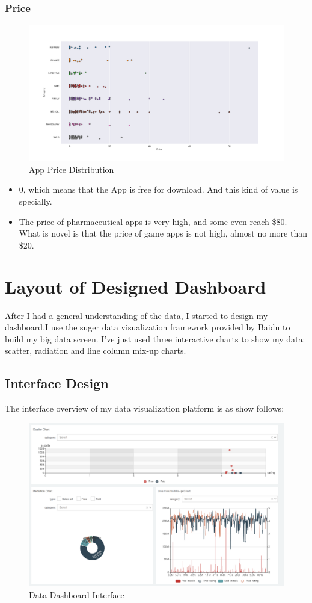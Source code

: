 \documentclass{hci}
\begin{document}
\subsubsection{Price}
\begin{figure}[htbp]
	\centering
	\includegraphics[width=0.7\linewidth]{figures/Price}
	\caption{App Price Distribution}
	\label{fig:Apppricedistribution}
\end{figure}


\begin{itemize}
	\item 0, which means that the App is free for download. And this kind of value is specially.
	\item The price of pharmaceutical apps is very high, and some even reach \$80. What is novel is that the price of game apps is not high, almost no more than \$20.
	
\end{itemize}

\section{Layout of Designed Dashboard}
After I had a general understanding of the data, I started to design my dashboard.I use the suger data visualization framework provided by Baidu to build my big data screen. I've just used three interactive charts to show my data:
scatter, radiation and line column mix-up charts.

\subsection{Interface Design}
The interface overview of my data visualization platform is as show follows:
\begin{figure}[htbp]
	\centering
	\includegraphics[width=0.8\linewidth]{figures/interface}
	\caption{Data Dashboard Interface}
	\label{fig:interface}
\end{figure}
\end{document}
